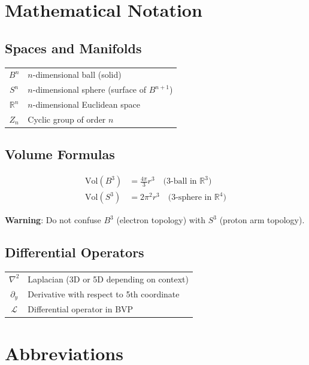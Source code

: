 \section{Mathematical Notation}

\subsection*{Spaces and Manifolds}

\begin{tabular}{cl}
$B^n$ & $n$-dimensional ball (solid) \\
$S^n$ & $n$-dimensional sphere (surface of $B^{n+1}$) \\
$\mathbb{R}^n$ & $n$-dimensional Euclidean space \\
$Z_n$ & Cyclic group of order $n$ \\
\end{tabular}

\subsection*{Volume Formulas}

\begin{align}
\text{Vol}(B^3) &= \frac{4\pi}{3}r^3 \quad \text{(3-ball in $\mathbb{R}^3$)} \\
\text{Vol}(S^3) &= 2\pi^2 r^3 \quad \text{(3-sphere in $\mathbb{R}^4$)}
\end{align}

\textbf{Warning}: Do not confuse $B^3$ (electron topology) with $S^3$ (proton arm topology).

\subsection*{Differential Operators}

\begin{tabular}{cl}
$\nabla^2$ & Laplacian (3D or 5D depending on context) \\
$\partial_y$ & Derivative with respect to 5th coordinate \\
$\mathcal{L}$ & Differential operator in BVP \\
\end{tabular}

\section{Abbreviations}


